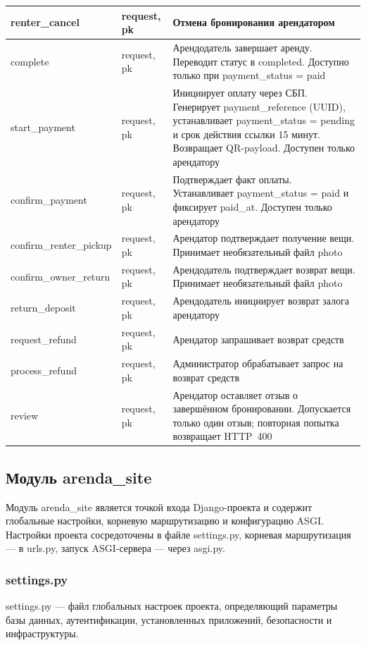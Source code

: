 \begin{xltabular}{\textwidth}{|p{4cm}|p{3cm}|X|}
    renter\_cancel & request, pk & Отмена бронирования арендатором \\ \hline
    complete & request, pk & Арендодатель завершает аренду. Переводит статус в completed. Доступно только при payment\_status = paid \\ \hline
    start\_payment & request, pk & Инициирует оплату через СБП. Генерирует payment\_reference (UUID), устанавливает payment\_status = pending и срок действия ссылки 15 минут. Возвращает QR-payload. Доступен только арендатору \\ \hline
    confirm\_payment & request, pk & Подтверждает факт оплаты. Устанавливает payment\_status = paid и фиксирует paid\_at. Доступен только арендатору \\ \hline
    confirm\_ren\-ter\_pickup & request, pk & Арендатор подтверждает получение вещи. Принимает необязательный файл photo \\ \hline
    confirm\_own\-er\_return & request, pk & Арендодатель подтверждает возврат вещи. Принимает необязательный файл photo \\ \hline
    return\_deposit & request, pk & Арендодатель инициирует возврат залога арендатору \\ \hline
    request\_refund & request, pk & Арендатор запрашивает возврат средств \\ \hline
    process\_refund & request, pk & Администратор обрабатывает запрос на возврат средств \\ \hline
    review & request, pk & Арендатор оставляет отзыв о завершённом бронировании. Допускается только один отзыв; повторная попытка возвращает HTTP~400 \\ \hline
\end{xltabular}
\renewcommand{\arraystretch}{1.0}

\subsection{Модуль arenda\_site}
Модуль arenda\_site является точкой входа Django-проекта и содержит глобальные настройки, корневую маршрутизацию и конфигурацию ASGI. Настройки проекта сосредоточены в файле settings.py, корневая маршрутизация — в urls.py, запуск ASGI-сервера — через asgi.py.

\subsubsection{settings.py}

settings.py — файл глобальных настроек проекта, определяющий
параметры базы данных, аутентификации, установленных приложений, безопасности
и инфраструктуры.

